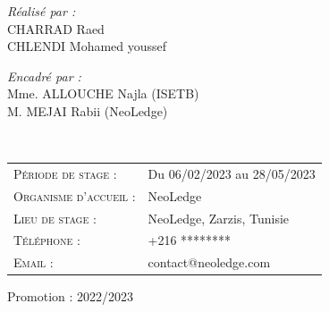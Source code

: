 \documentclass[a4paper,12pt]{report}
\begin{document}
\begin{titlepage}
\noindent

\begin{minipage}{7cm}
	\begin{center}
		\vspace{-7mm}
\begin{flushleft} \large
  \emph{Réalisé par :}\\
  \textsc{CHARRAD} Raed \\
  \textsc{CHLENDI} Mohamed youssef 
\end{flushleft}
	\end{center}
\end{minipage}\hfill
\begin{minipage}{8cm}
  \vspace{-7mm}
  \begin{flushright} \large
    \begin{flushleft} \large
    \emph{Encadré par :} \\
    Mme. \textsc{ALLOUCHE} Najla  (ISETB)\\[0.1cm]
    M. \textsc{MEJAI} Rabii  (NeoLedge)\\
    \end{flushleft}
  \end{flushright}
\end{minipage}
\hfill\\
\vspace{1cm}
\begin{tabular}{ll}
\large \textsc{Période de stage :} & \large Du 06/02/2023 au 28/05/2023\\
\large \textsc{Organisme d'accueil :} & \large NeoLedge\\
\large \textsc{Lieu de stage :} & \large NeoLedge, Zarzis, Tunisie\\
\large \textsc{Téléphone :} & \large +216 ********\\
\large \textsc{Email :} & \large contact@neoledge.com\\

\end{tabular}




\vspace{20mm}
{\large Promotion : 2022/2023}

\end{titlepage}
\end{document}
